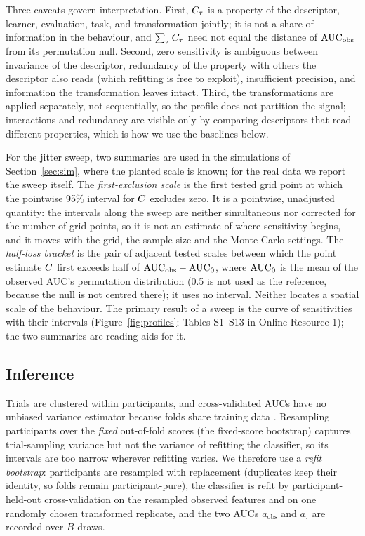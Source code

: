 Three caveats govern interpretation. First, $C_\tau$ is a property of the descriptor, learner, evaluation, task, and transformation jointly; it is not a share of information in the behaviour, and $\sum_\tau C_\tau$ need not equal the distance of $\mathrm{AUC}_{\mathrm{obs}}$ from its permutation null. Second, zero sensitivity is ambiguous between invariance of the descriptor, redundancy of the property with others the descriptor also reads (which refitting is free to exploit), insufficient precision, and information the transformation leaves intact. Third, the transformations are applied separately, not sequentially, so the profile does not partition the signal; interactions and redundancy are visible only by comparing descriptors that read different properties, which is how we use the baselines below.

For the jitter sweep, two summaries are used in the simulations of Section~\ref{sec:sim}, where the planted scale is known; for the real data we report the sweep itself. The \emph{first-exclusion scale} is the first tested grid point at which the pointwise 95\% interval for $C$ excludes zero. It is a pointwise, unadjusted quantity: the intervals along the sweep are neither simultaneous nor corrected for the number of grid points, so it is not an estimate of where sensitivity begins, and it moves with the grid, the sample size and the Monte-Carlo settings. The \emph{half-loss bracket} is the pair of adjacent tested scales between which the point estimate $C$ first exceeds half of $\mathrm{AUC}_{\mathrm{obs}} - \mathrm{AUC}_0$, where $\mathrm{AUC}_0$ is the mean of the observed AUC's permutation distribution (0.5 is not used as the reference, because the null is not centred there); it uses no interval. Neither locates a spatial scale of the behaviour. The primary result of a sweep is the curve of sensitivities with their intervals (Figure~\ref{fig:profiles}; Tables S1--S13 in Online Resource 1); the two summaries are reading aids for it.

\subsection{Inference}\label{sec:inf}
Trials are clustered within participants, and cross-validated AUCs have no unbiased variance estimator because folds share training data \citep{varoquaux2018cross}. Resampling participants over the \emph{fixed} out-of-fold scores (the fixed-score bootstrap) captures trial-sampling variance but not the variance of refitting the classifier, so its intervals are too narrow wherever refitting varies. We therefore use a \emph{refit bootstrap}: participants are resampled with replacement (duplicates keep their identity, so folds remain participant-pure), the classifier is refit by participant-held-out cross-validation on the resampled observed features and on one randomly chosen transformed replicate, and the two AUCs $a_{\mathrm{obs}}$ and $a_{\tau}$ are recorded over $B$ draws.


